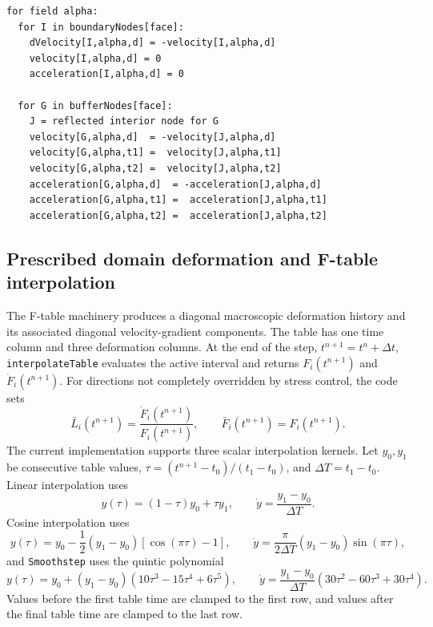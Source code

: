 \begin{lstlisting}[caption={Symmetry-face enforcement.}]
for field alpha:
  for I in boundaryNodes[face]:
    dVelocity[I,alpha,d] = -velocity[I,alpha,d]
    velocity[I,alpha,d] = 0
    acceleration[I,alpha,d] = 0

  for G in bufferNodes[face]:
    J = reflected interior node for G
    velocity[G,alpha,d]  = -velocity[J,alpha,d]
    velocity[G,alpha,t1] =  velocity[J,alpha,t1]
    velocity[G,alpha,t2] =  velocity[J,alpha,t2]
    acceleration[G,alpha,d]  = -acceleration[J,alpha,d]
    acceleration[G,alpha,t1] =  acceleration[J,alpha,t1]
    acceleration[G,alpha,t2] =  acceleration[J,alpha,t2]
\end{lstlisting}

\subsection{Prescribed domain deformation and F-table interpolation}
\label{subsec:bc-ftable-internals}

The F-table machinery produces a diagonal macroscopic deformation history and its associated diagonal velocity-gradient components.  The table has one time column and three deformation columns.  At the end of the step, $t^{n+1}=t^n+\Delta t$, \texttt{interpolateTable} evaluates the active interval and returns $F_i(t^{n+1})$ and $\dot F_i(t^{n+1})$.  For directions not completely overridden by stress control, the code sets
\begin{equation}
  \bar L_i(t^{n+1}) = \frac{\dot F_i(t^{n+1})}{F_i(t^{n+1})},
  \qquad
  \bar F_i(t^{n+1}) = F_i(t^{n+1}).
  \label{eq:bc-ftable-l}
\end{equation}
The current implementation supports three scalar interpolation kernels.  Let $y_0,y_1$ be consecutive table values, $\tau=(t^{n+1}-t_0)/(t_1-t_0)$, and $\Delta T=t_1-t_0$.  Linear interpolation uses
\begin{equation}
  y(\tau)=(1-\tau)y_0+\tau y_1,
  \qquad
  \dot y=\frac{y_1-y_0}{\Delta T}.
\end{equation}
Cosine interpolation uses
\begin{equation}
  y(\tau)=y_0-\frac{1}{2}(y_1-y_0)\left[\cos(\pi\tau)-1\right],
  \qquad
  \dot y=\frac{\pi}{2\Delta T}(y_1-y_0)\sin(\pi\tau),
\end{equation}
and \texttt{Smoothstep} uses the quintic polynomial
\begin{equation}
  y(\tau)=y_0+(y_1-y_0)(10\tau^3-15\tau^4+6\tau^5),
  \qquad
  \dot y=\frac{y_1-y_0}{\Delta T}(30\tau^2-60\tau^3+30\tau^4).
\end{equation}
Values before the first table time are clamped to the first row, and values after the final table time are clamped to the last row.

